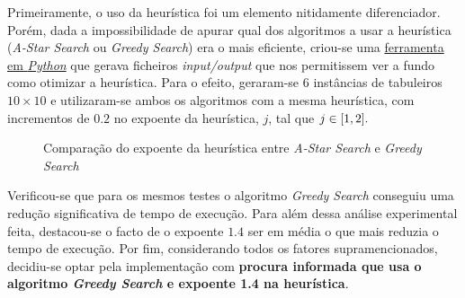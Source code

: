 \documentclass[12pt]{exam}
\renewcommand\_{\textunderscore\linebreak[1]}
\begin{document}
        \indent Primeiramente, o uso da heurística foi um elemento nitidamente diferenciador. Porém, dada a impossibilidade de apurar qual dos algoritmos a usar a heurística (\textit{A-Star Search} ou \textit{Greedy Search}) era o mais eficiente, criou-se uma \href{https://github.com/ImGugz/IA2122/blob/main/src/generator.py}{ferramenta em \textit{Python}} que gerava ficheiros \textit{input/output} que nos permitissem ver a fundo como otimizar a heurística. Para o efeito, geraram-se 6 instâncias de tabuleiros $10 \times 10$ e utilizaram-se ambos os algoritmos com a mesma heurística, com incrementos de $0.2$ no expoente da heurística, $j$, tal que $j \in \interval{1}{2}.$
        \vspace{-4.5mm}
        \begin{figure}[ht!]
        \centering
        \qquad
        \caption{Comparação do expoente da heurística entre \textit{A-Star Search} e \textit{Greedy Search}}%
        \label{fig:example}%
        \end{figure}

        \indent Verificou-se que para os mesmos testes o algoritmo \textit{Greedy Search} conseguiu uma redução significativa de tempo de execução. Para além dessa análise experimental feita, destacou-se o facto de o expoente $1.4$ ser em média o que mais reduzia o tempo de execução. Por fim, considerando todos os fatores supramencionados, decidiu-se optar pela implementação com \textbf{procura informada que usa o algoritmo \textit{Greedy Search} e expoente 1.4 na heurística}.
\end{document}
